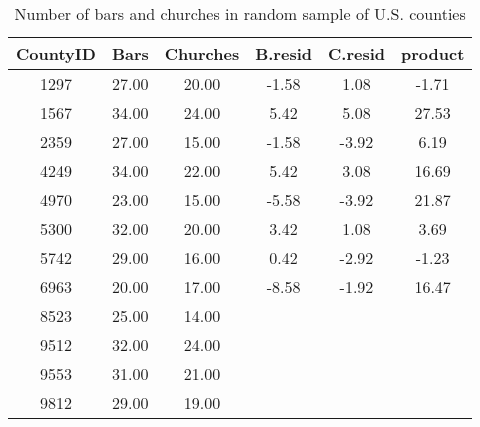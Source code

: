 \documentclass[11pt]{exam}
\begin{document}
\begin{questions}
\begin{table}[ht]
\begin{center}
\begin{tabular}{|c|c|c|c|c|c|}
  \hline
CountyID & Bars & Churches & B.resid & C.resid & product \\ 
  \hline
1297 & 27.00 & 20.00 & -1.58 & 1.08 & -1.71 \\ 
   \hline
1567 & 34.00 & 24.00 & 5.42 & 5.08 & 27.53 \\ 
   \hline
2359 & 27.00 & 15.00 & -1.58 & -3.92 & 6.19 \\ 
   \hline
4249 & 34.00 & 22.00 & 5.42 & 3.08 & 16.69 \\ 
   \hline
4970 & 23.00 & 15.00 & -5.58 & -3.92 & 21.87 \\ 
   \hline
5300 & 32.00 & 20.00 & 3.42 & 1.08 & 3.69 \\ 
   \hline
5742 & 29.00 & 16.00 & 0.42 & -2.92 & -1.23 \\ 
   \hline
6963 & 20.00 & 17.00 & -8.58 & -1.92 & 16.47 \\ 
   \hline
8523 & 25.00 & 14.00 &  &  &  \\ 
   \hline
9512 & 32.00 & 24.00 &  &  &  \\ 
   \hline
9553 & 31.00 & 21.00 &  &  &  \\ 
   \hline
9812 & 29.00 & 19.00 &  &  &  \\ 
   \hline
\end{tabular}
\caption{Number of bars and churches in random sample of U.S. counties}
\label{tab:church}
\end{center}
\end{table}\fi

\end{questions}
\end{document}
